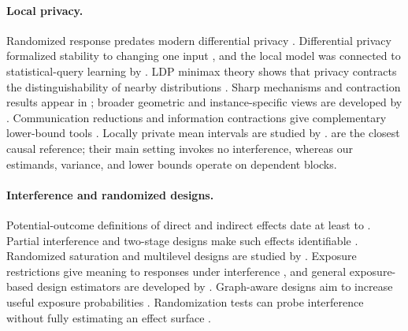 \documentclass[10pt]{article}
\theoremstyle{definition}
\theoremstyle{remark}
\begin{document}
\paragraph{Local privacy.}
Randomized response predates modern differential privacy \citep{Warner1965}. Differential
privacy formalized stability to changing one input \citep{DworkMcSherryNissimSmith2006}, and
the local model was connected to statistical-query learning by
\citet{KasiviswanathanEtAl2011}. LDP minimax theory shows that privacy contracts the
distinguishability of nearby distributions \citep{DuchiJordanWainwright2013,
DuchiJordanWainwright2018}. Sharp mechanisms and contraction results appear in
\citet{KairouzOhViswanath2016,KairouzBonawitzRamage2016,AsoodehZhang2024}; broader
geometric and instance-specific views are developed by
\citet{RohdeSteinberger2020,DuchiRuan2024}. Communication reductions and information
contractions give complementary lower-bound tools
\citep{DuchiRogers2019,AcharyaCanonneTyagi2020,BarnesHanOzgur2020,Raginsky2016}.
Locally private mean intervals are studied by \citet{GaboardiRogersSheffet2019}.
\citet{OhnishiAwan2025} are the closest causal reference; their main setting invokes no
interference, whereas our estimands, variance, and lower bounds operate on dependent blocks.

\paragraph{Interference and randomized designs.}
Potential-outcome definitions of direct and indirect effects date at least to
\citet{HalloranStruchiner1995}. Partial interference and two-stage designs make such effects
identifiable \citep{Sobel2006,HudgensHalloran2008,TchetgenTchetgenVanderWeele2012,
LiuHudgens2014,BasseFeller2018}. Randomized saturation and multilevel designs are studied by
\citet{SinclairMcConnellGreen2012,BairdBohrenMcIntoshOzler2018}. Exposure restrictions give
meaning to responses under interference \citep{Manski2013}, and general exposure-based
design estimators are developed by \citet{AronowSamii2017}. Graph-aware designs aim to
increase useful exposure probabilities
\citep{UganderKarrerBackstromKleinberg2013,EcklesKarrerUgander2017}. Randomization tests can
probe interference without fully estimating an effect surface
\citep{BowersFredricksonPanagopoulos2013,AtheyEcklesImbens2018}.
\end{document}
